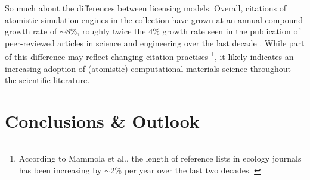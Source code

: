\documentclass[9pt,review]{livecoms}
\begin{document}




So much about the differences between licensing models. 
Overall, citations of atomistic simulation engines in the collection have grown at an annual compound growth rate of ${\sim}8\%$, 
roughly twice the $4\%$ growth rate seen in the publication of peer-reviewed articles in science and engineering over the last decade \cite{citation-us}.
While part of this difference may reflect changing citation practises%
\footnote{According to Mammola et al., the length of reference lists in ecology journals has been increasing by ${\sim}2\%$ per year over the last two decades. \cite{Mammola2021}},
it likely indicates an increasing adoption of (atomistic) computational materials science throughout the scientific literature. 


\section{Conclusions \& Outlook}

\end{document}
